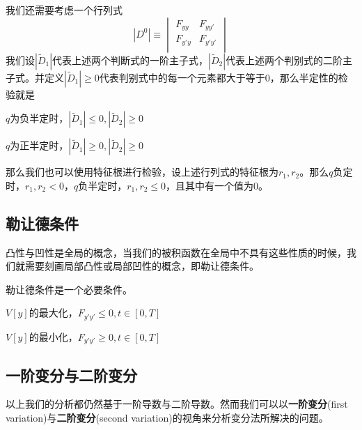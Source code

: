 \documentclass[UTF8,12pt]{ctexart}
\numberwithin{equation}{section} %
\numberwithin{figure}{section}
\numberwithin{table}{section}
\begin{document}
	我们还需要考虑一个行列式
	\begin{equation}
		|D^0| \equiv
		\begin{vmatrix}
			F_{yy} & F_{yy'} \\
			F_{y'y} & F_{y'y'} \\
		\end{vmatrix}
	\end{equation}
	我们设$|\tilde{D}_1|$代表上述两个判断式的一阶主子式，$|\tilde{D}_2|$代表上述两个判别式的二阶主子式。并定义$|\tilde{D}_1| \geqslant 0$代表判别式中的每一个元素都大于等于0，那么半定性的检验就是
	
	$q$为负半定时，$|\tilde{D}_1| \leqslant 0,|\tilde{D}_2| \geqslant 0$
	
	$q$为正半定时，$|\tilde{D}_1| \geqslant 0,|\tilde{D}_2| \geqslant 0$
	
	那么我们也可以使用特征根进行检验，设上述行列式的特征根为$r_1,r_2$。那么$q$负定时，$r_1,r_2 < 0$，$q$负半定时，$r_1,r_2 \leqslant 0$，且其中有一个值为0。

	
	\subsection{勒让德条件}
	凸性与凹性是全局的概念，当我们的被积函数在全局中不具有这些性质的时候，我们就需要刻画局部凸性或局部凹性的概念，即勒让德条件。
	
	勒让德条件是一个必要条件。
	
	$V[y]$的最大化，$F_{y'y'} \leqslant 0,t \in [0,T]$
	
	$V[y]$的最小化，$F_{y'y'} \geqslant 0,t \in [0,T]$
	
	\subsection{一阶变分与二阶变分}
	以上我们的分析都仍然基于一阶导数与二阶导数。然而我们可以以\textbf{一阶变分}(first variation)与\textbf{二阶变分}(second variation)的视角来分析变分法所解决的问题。
	
\end{document}
